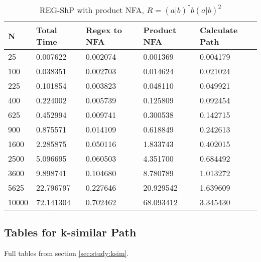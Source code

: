 \documentclass[]{article}
\numberwithin{equation}{section}
\begin{document}
\begin{appendices}
\begin{table}[H]
	\centering
	\small
	\setlength\tabcolsep{2pt}
	\begin{tabular}{|l|l|l|l|l|}
		\hline
		N     & Total Time & Regex to NFA & Product NFA & Calculate Path \\ \hline
		25    & 0.007622   & 0.002074     & 0.001369    & 0.004179       \\ \hline
		100   & 0.038351   & 0.002703     & 0.014624    & 0.021024       \\ \hline
		225   & 0.101854   & 0.003823     & 0.048110    & 0.049921       \\ \hline
		400   & 0.224002   & 0.005739     & 0.125809    & 0.092454       \\ \hline
		625   & 0.452994   & 0.009741     & 0.300538    & 0.142715       \\ \hline
		900   & 0.875571   & 0.014109     & 0.618849    & 0.242613       \\ \hline
		1600  & 2.285875   & 0.050116     & 1.833743    & 0.402015       \\ \hline
		2500  & 5.096695   & 0.060503     & 4.351700    & 0.684492       \\ \hline
		3600  & 9.898741   & 0.104680     & 8.780789    & 1.013272       \\ \hline
		5625  & 22.796797  & 0.227646     & 20.929542   & 1.639609       \\ \hline
		10000 & 72.141304  & 0.702462     & 68.093412   & 3.345430       \\ \hline
	\end{tabular}
	\caption{REG-ShP with product NFA, $R = (a|b)^*b(a|b)^2$}
\end{table}

\subsection{Tables for k-similar Path}
\label{app:tables:ksim}

Full tables from section \ref{sec:study:ksim}.\\


\end{appendices}
\end{document}

